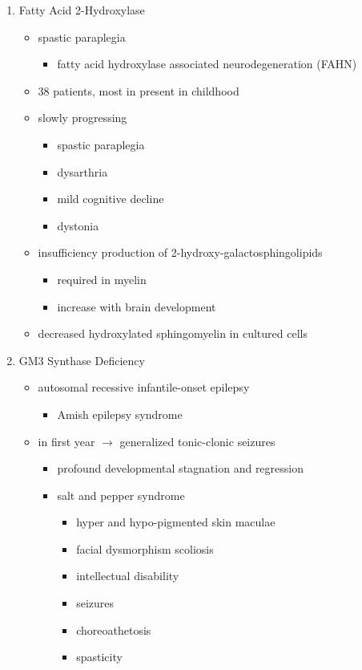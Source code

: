 \documentclass{scrartcl}
\begin{document}
\begin{enumerate}
\item Fatty Acid 2-Hydroxylase
\label{sec:orgfadd023}

\begin{itemize}
\item spastic paraplegia
\begin{itemize}
\item fatty acid hydroxylase associated neurodegeneration (FAHN)
\end{itemize}
\item 38 patients, most in present in childhood
\item slowly progressing
\begin{itemize}
\item spastic paraplegia
\item dysarthria
\item mild cognitive decline
\item dystonia
\end{itemize}

\item insufficiency production of 2-hydroxy-galactosphingolipids
\begin{itemize}
\item required in myelin
\item increase with brain development
\end{itemize}

\item decreased hydroxylated sphingomyelin in cultured cells
\end{itemize}

\item GM3 Synthase Deficiency
\label{sec:orgf1665b7}

\begin{itemize}
\item autosomal recessive infantile-onset epilepsy
\begin{itemize}
\item Amish epilepsy syndrome
\end{itemize}
\item in first year \(\to\) generalized tonic-clonic seizures
\begin{itemize}
\item profound developmental stagnation and regression
\item salt and pepper syndrome
\begin{itemize}
\item hyper and hypo-pigmented skin maculae
\item facial dysmorphism scoliosis
\item intellectual disability
\item seizures
\item choreoathetosis
\item spasticity
\end{itemize}
\end{itemize}


\end{itemize}
\end{enumerate}
\end{document}

